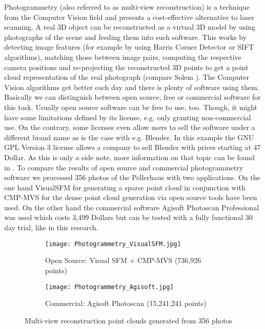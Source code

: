 Photogrammetry (also referred to as multi-view reconstruction) is a technique from the Computer Vision field and presents a cost-effective alternative to laser scanning. A real 3D object can be reconstructed as a virtual 3D model by using photographs of the scene and feeding them into such software. This works by detecting image features (for example by using Harris Corner Detector or SIFT algorithms), matching those between image pairs, computing the respective camera positions and re-projecting the reconstructed 3D points to get a point cloud representation of the real photograph (compare Solem \parencite[][p29]{bookProgrammingComputerVisionwithPython}).
The Computer Vision algorithms get better each day and there is plenty of software using them. Basically we can distinguish between open source, free or commercial software for this task. Usually open source software can be free to use, too. Though, it might have some limitations defined by its license, e.g. only granting non-commercial use. On the contrary, some licenses even allow users to sell the software under a different brand name as is the case with e.g. Blender. In this example the GNU GPL Version 3 license allows a company to sell Blender with prices starting at 47 Dollar. As this is only a side note, more information on that topic can be found in \parencite{blender_rebranding}.
To compare the results of open source and commercial photogrammetry software we processed 356 photos of the Pellerhaus with two applications. On the one hand VisualSFM for generating a sparse point cloud in conjunction with CMP-MVS for the dense point cloud generation via open source tools have been used. On the other hand the commercial software Agisoft Photoscan Professional was used which costs 3,499 Dollars but can be tested with a fully functional 30 day trial, like in this research.

\begin{figure}[h]
	\centering
	\begin{subfigure}[b]{0.8\textwidth}
		\centering
		\texttt{[image: Photogrammetry\_VisualSFM.jpg]}
		\caption{Open Source: Visual SFM + CMP-MVS (736,926 points)}
		\label{fig:visualsfm}
	\end{subfigure}
	\hfill
	\begin{subfigure}[b]{0.8\textwidth}
		\centering
		\texttt{[image: Photogrammetry\_Agisoft.jpg]}
		\caption{Commercial: Agisoft Photoscan (15,241,241 points)}
		\label{fig:photoscan}
	\end{subfigure}
	\caption{Multi-view reconstruction point clouds generated from 356 photos}
	\label{fig:multiview reconstruction pellerhaus}
\end{figure}

